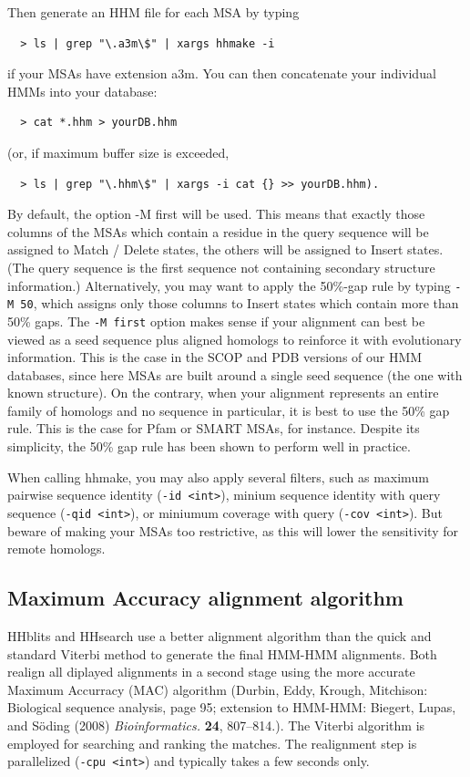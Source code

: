 \documentclass[11pt,a4paper]{article}
\begin{document}
Then generate an HHM file for each MSA by typing
\begin{verbatim}
  > ls | grep "\.a3m\$" | xargs hhmake -i 
\end{verbatim}

if your MSAs have extension a3m. You can then concatenate your individual HMMs
into your database:
\begin{verbatim}
  > cat *.hhm > yourDB.hhm
\end{verbatim}
(or, if maximum buffer size is exceeded, 
\begin{verbatim}
  > ls | grep "\.hhm\$" | xargs -i cat {} >> yourDB.hhm).
\end{verbatim}

By default, the option -M first will be used. This means that exactly those columns of 
the MSAs which contain a residue in the query sequence will be assigned to Match 
/ Delete states, the others will be assigned to Insert states. (The query sequence is 
the first sequence not containing secondary structure information.) Alternatively, you 
may want to apply the 50\%-gap rule by typing \verb`-M 50`, which assigns only those columns 
to Insert states which contain more than 50\% gaps. The \verb`-M first` option makes sense 
if your alignment can best be viewed as a seed sequence plus aligned homologs to 
reinforce it with evolutionary information. This is the case in the SCOP and PDB 
versions of our HMM databases, since here MSAs are built around a single seed 
sequence (the one with known structure). On the contrary, when your alignment 
represents an entire family of homologs and no sequence in particular, it is best to 
use the 50\% gap rule. This is the case for Pfam or SMART MSAs, for instance. 
Despite its simplicity, the 50\% gap rule has been shown to perform well in practice.

When calling hhmake, you may also apply several filters, such as maximum pairwise 
sequence identity (\verb`-id <int>`), minium sequence identity with query sequence 
(\verb`-qid <int>`), or miniumum coverage with query (\verb`-cov <int>`). But beware 
of making your MSAs too restrictive, as this will lower the sensitivity for remote homologs.


\subsection{Maximum Accuracy alignment algorithm}

HHblits and HHsearch use a better alignment algorithm than the quick and 
standard Viterbi method to generate the final HMM-HMM alignments. Both realign
all diplayed alignments in a second stage using the more accurate Maximum Accurracy 
(MAC) algorithm (Durbin, Eddy, Krough, Mitchison: Biological sequence analysis, page 
95; extension to HMM-HMM: Biegert, Lupas, and S\"oding (2008) \emph{Bioinformatics.} 
\textbf{24}, 807--814.). The Viterbi algorithm is employed for searching and ranking the 
matches. The realignment step is parallelized (\verb`-cpu <int>`) and typically takes a 
few seconds only.    
\end{document}
